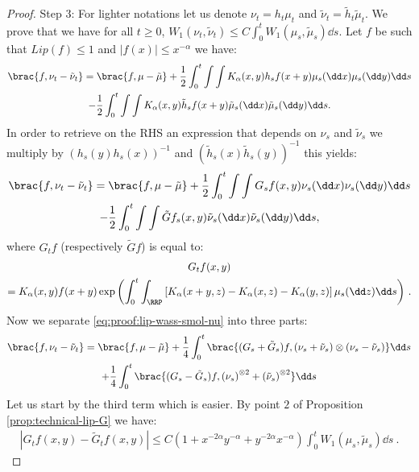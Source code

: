 \begin{proof}
    Step $3$: For lighter notations let us denote $\nu_t = h_t\mu_t$ and $\tilde{\nu}_t = \tilde{h}_t\tilde{\mu}_t$. We prove that we have for all $t \geq 0$, $W_1(\nu_t , \tilde{\nu}_t) \leq C\int_0^t W_1(\mu_s,\tilde{\mu}_s)\dd s$. Let $f$ be such that $Lip(f) \leq 1$ and $|f(x)| \leq x^{-\alpha}$ we have:
    \begin{multline*}
        \brac{f,\nu_t -\tilde{\nu}_t} = \brac{f,\mu - \tilde{\mu}} + \dfrac12\int_0^t \int\int K_\alpha(x ,y)h_sf(x+y) \mu_s(\dd x) \mu_s (\dd y) \dd s \\
        - \dfrac12\int_0^t \int\int K_\alpha(x ,y)\tilde{h}_sf(x+y) \tilde{\mu}_s(\dd x) \tilde{\mu}_s (\dd y) \dd s.
    \end{multline*}
    In order to retrieve on the RHS an expression that depends on $\nu_s$ and $\tilde{\nu}_s$ we multiply by $(h_s(y)h_s(x))^{-1}$ and $(\tilde{h}_s(x)\tilde{h}_s(y))^{-1}$ this yields:
    \begin{multline}\label{eq:proof:lip-wass-smol-nu}
        \brac{f,\nu_t -\tilde{\nu}_t} = \brac{f,\mu - \tilde{\mu}} + \dfrac12\int_0^t \int\int G_sf(x ,y) \nu_s(\dd x) \nu_s (\dd y) \dd s \\
        - \dfrac12\int_0^t \int\int \tilde{G}f_s(x, y) \tilde{\nu}_s(\dd x) \tilde{\nu}_s (\dd y) \dd s,
    \end{multline}
    where $G_tf$ (respectively $\tilde{G}f$) is equal to:
    \begin{multline*}
        G_tf(x,y) \\
        = K_\alpha (x,y)f(x+y)\exp{\left(\int_0^t\int_{\RRP}\left[ K_\alpha(x+y,z) - K_\alpha(x,z) -K_\alpha(y,z)\right] \mu_s(\dd z) \dd s\right)}\ .
    \end{multline*}
    Now we separate  \eqref{eq:proof:lip-wass-smol-nu} into three parts:
    \begin{multline*}
        \brac{f,\nu_t -\tilde{\nu}_t} = \brac{f,\mu - \tilde{\mu}} + \dfrac14\int_0^t \brac{(G_s + \tilde{G}_s)f,\left(\nu_s + \tilde{\nu}_s\right)\otimes\left(\nu_s - \tilde{\nu}_s\right) }\dd s\\
        + \dfrac14\int_0^t \brac{(G_s - \tilde{G}_s)f, \left(\nu_s\right)^{\otimes 2} + \left(\tilde{\nu}_s\right)^{\otimes 2}}\dd s
    \end{multline*}
    Let us start by the third term which is easier. By point $2$ of Proposition \ref{prop:technical-lip-G} we have:
    \begin{align*}
        |G_tf(x,y) - \tilde{G}_tf(x,y)| \leq C (1 + x^{-2\alpha}y^{-\alpha} + y^{-2\alpha}x^{-\alpha}) \int_0^t W_1(\mu_s,\tilde{\mu}_s) \dd s\ .

\end{align*}
\end{proof}

